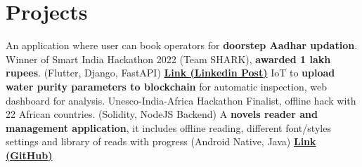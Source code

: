 \section{Projects}
  \resumeSubHeadingListStart
      {An application where user can book operators for \textbf{doorstep Aadhar updation}. Winner of Smart India Hackathon 2022 (Team SHARK), \textbf{awarded 1 lakh rupees}. (Flutter, Django, FastAPI) \href{https://www.linkedin.com/posts/hsk4link_sih-sih2022-smartindiahackathon-activity-6970324738409672704-YcQA/}{\textbf{Link (Linkedin Post)}}}
      {IoT to \textbf{upload water purity parameters to blockchain} for automatic inspection, web dashboard for analysis. Unesco-India-Africa Hackathon Finalist, offline hack with 22 African countries. (Solidity, NodeJS Backend)}
      {A \textbf{novels reader and management application}, it includes offline reading, different font/styles settings and library of reads with progress (Android Native, Java) \href{https://github.com/hari01584/NovelNation}{\textbf{Link (GitHub)}}}


  \resumeSubHeadingListEnd